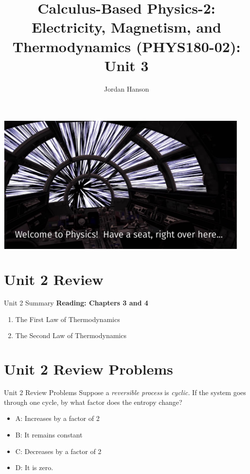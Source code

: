 \documentclass{beamer}
\title{Calculus-Based Physics-2: Electricity, Magnetism, and Thermodynamics (PHYS180-02): Unit 3}
\author{Jordan Hanson}
\institute{Whittier College Department of Physics and Astronomy}
\begin{document}
\maketitle

\begin{frame}
\centering
\includegraphics[width=0.95\textwidth]{figures/hyper.pdf}
\end{frame}

\section{Unit 2 Review}

\begin{frame}{Unit 2 Summary}
\textbf{Reading: Chapters 3 and 4}
\begin{enumerate}
\item The First Law of Thermodynamics
\item The Second Law of Thermodynamics
\end{enumerate}
\end{frame}

\section{Unit 2 Review Problems}

\begin{frame}{Unit 2 Review Problems}
Suppose a \textit{reversible process} is \textit{cyclic.}  If the system goes through one cycle, by what factor does the entropy change?
\begin{itemize}
\item A: Increases by a factor of 2
\item B: It remains constant
\item C: Decreases by a factor of 2
\item D: It is zero.
\end{itemize}
\end{frame}
\end{document}
